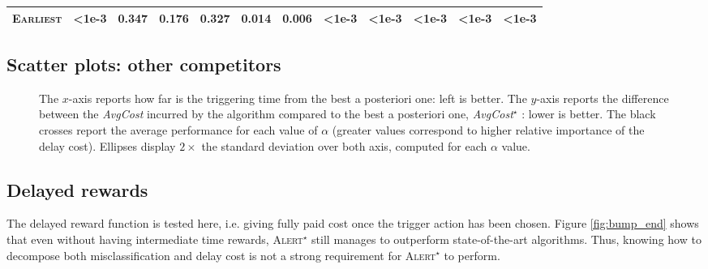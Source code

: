 \documentclass[sigconf, nonacm, table]{acmart}
\begin{document}
\begin{table}[!htb]
{\begin{tabular}{cc|c|c|c|c|c|c|c|c|c|c|c|}
    \multicolumn{2}{|c|}{\textsc{Earliest}} & \cellcolor{lightgray}\textbf{<1e-3} & 0.347 & 0.176 & 0.327 & \cellcolor{lightgray}\textbf{0.014} & \cellcolor{lightgray}\textbf{0.006} & \cellcolor{lightgray}\textbf{<1e-3} & \cellcolor{lightgray}\textbf{<1e-3} & \cellcolor{lightgray}\textbf{<1e-3} & \cellcolor{lightgray}\textbf{<1e-3} & \cellcolor{lightgray}\textbf{<1e-3} \\
    \hline
    \end{tabular}}
    \label{tab:wilco_alert}
\end{table}


\subsection{Scatter plots: other competitors}\label{app_scatter}

\begin{figure}[!htp]
    \centering
    \caption{The $x$-axis reports how far is the triggering time from the best a posteriori one: left is better. The $y$-axis reports the difference between the \textit{AvgCost} incurred by the algorithm compared to the best a posteriori one, \textit{AvgCost}$^{\star}$ : lower is better. The black crosses report the average performance for each value of $\alpha$ (greater values correspond to higher relative importance of the delay cost). Ellipses display $2 \times$ the standard deviation over both axis, computed for each $\alpha$ value.}
    \label{fig:enter-label}
\end{figure}

\subsection{Delayed rewards}\label{app_end}

The delayed reward function is tested here, i.e. giving fully paid cost once the trigger action has been chosen. Figure \ref{fig:bump_end} shows that even without having intermediate time rewards, \textsc{Alert$^{\star}$} still manages to outperform state-of-the-art algorithms. Thus, knowing how to decompose both misclassification and delay cost is not a strong requirement for \textsc{Alert$^{\star}$} to perform.
\end{document}
